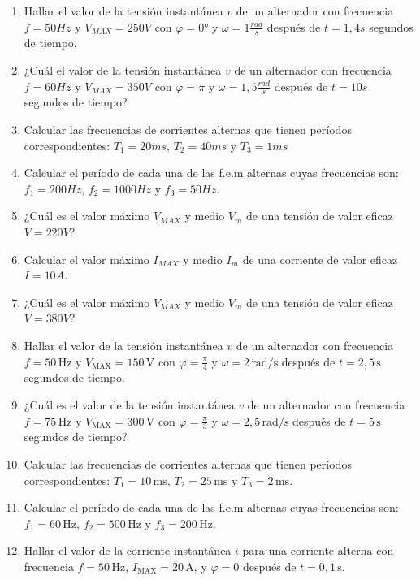 \documentclass[../main]{subfiles}
\begin{document}
\begin{enumerate}
    \item Hallar el valor de la tensión instantánea $v$ de un alternador con frecuencia $f=50Hz$ y $V_{MAX}=250V$ con $\varphi=0°$ y $\omega=1 \frac{rad}{s}$ después de $t=1,4s$ segundos de tiempo.
    \item ¿Cuál el valor de la tensión instantánea $v$ de un alternador con frecuencia $f=60Hz$ y $V_{MAX}=350V$ con $\varphi=\pi$ y $\omega=1,5 \frac{rad}{s}$ después de $t=10s$ segundos de tiempo?
    
    \item Calcular las frecuencias de corrientes alternas que tienen períodos correspondientes: $T_1=20ms$, $T_2=40ms$ y $T_3=1ms$
    \item Calcular el período de cada una de las f.e.m alternas cuyas frecuencias son: $f_1=200Hz$, $f_2=1000Hz$ y $f_3=50Hz$.
    \item ¿Cuál es el valor máximo $V_{MAX}$ y medio $V_m$ de una tensión de valor eficaz $V=220V$?
    \item Calcular el valor máximo $I_{MAX}$ y medio $I_m$ de una corriente de valor eficaz $I=10A$.
    \item ¿Cuál es el valor máximo $V_{MAX}$ y medio $V_m$ de una tensión de valor eficaz $V=380V$?

    \item Hallar el valor de la tensión instantánea $v$ de un alternador con frecuencia $f=50\,\text{Hz}$ y $V_{\text{MAX}}=150\,\text{V}$ con $\varphi=\frac{\pi}{4}$ y $\omega=2\,\text{rad/s}$ después de $t=2,5\,\text{s}$ segundos de tiempo.
    
    \item ¿Cuál es el valor de la tensión instantánea $v$ de un alternador con frecuencia $f=75\,\text{Hz}$ y $V_{\text{MAX}}=300\,\text{V}$ con $\varphi=\frac{\pi}{3}$ y $\omega=2,5\,\text{rad/s}$ después de $t=5\,\text{s}$ segundos de tiempo?
    
    \item Calcular las frecuencias de corrientes alternas que tienen períodos correspondientes: $T_1=10\,\text{ms}$, $T_2=25\,\text{ms}$ y $T_3=2\,\text{ms}$.
    
    \item Calcular el período de cada una de las f.e.m alternas cuyas frecuencias son: $f_1=60\,\text{Hz}$, $f_2=500\,\text{Hz}$ y $f_3=200\,\text{Hz}$.
    
    \item Hallar el valor de la corriente instantánea $i$ para una corriente alterna con frecuencia $f=50\,\text{Hz}$, $I_{\text{MAX}}=20\,\text{A}$, y $\varphi=0$ después de $t=0,1\,\text{s}$.
    

\end{enumerate}
\end{document}
